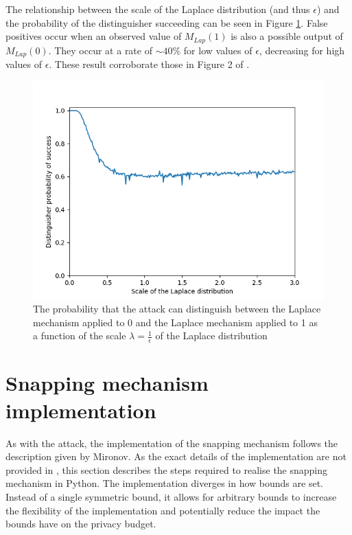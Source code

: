 \documentclass[orivec,envcountsame]{llncs}
\begin{document}
The relationship between the scale of the Laplace distribution (and thus $\epsilon$) and the probability of the distinguisher succeeding can be seen in Figure \ref{fig:prob}. False positives occur when an observed value of $M_{Lap}(1)$ is also a possible output of $M_{Lap}(0)$. They occur at a rate of $\sim40\%$ for low values of $\epsilon$, decreasing for high values of $\epsilon$. These result corroborate those in Figure 2 of \cite{mironov2012significance}.

\begin{figure}[h]
\begin{center}
\includegraphics[scale=0.65]{tex/graphics/Probability.png}
\caption{The probability that the attack can distinguish between the Laplace mechanism applied to 0 and the Laplace mechanism applied to 1 as a function of the scale $\lambda=\frac{1}{\epsilon}$ of the Laplace distribution}
\label{fig:prob}
\end{center}
\end{figure}



\section{Snapping mechanism implementation}
As with the attack, the implementation of the snapping mechanism follows the description given by Mironov. As the exact details of the implementation are not provided in \cite{mironov2012significance}, this section describes the steps required to realise the snapping mechanism in Python. The implementation diverges in how bounds are set. Instead of a single symmetric bound, it allows for arbitrary bounds to increase the flexibility of the implementation and potentially reduce the impact the bounds have on the privacy budget.
\end{document}
